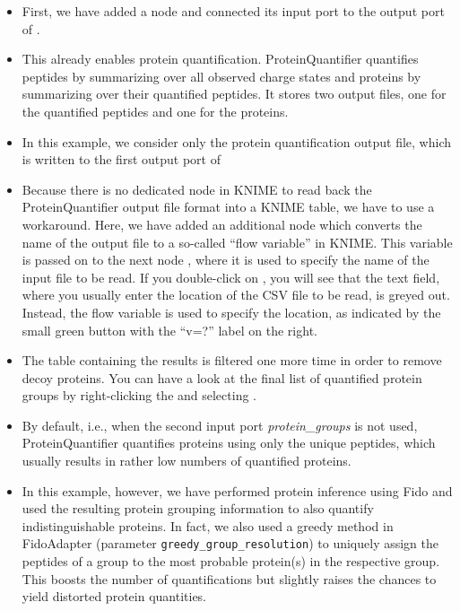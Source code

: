 \begin{itemize}
\item First, we have added a  node and connected its input port to the output port of .
\item This already enables protein quantification. ProteinQuantifier quantifies peptides by summarizing over all observed charge states and proteins
by summarizing over their quantified peptides. It stores two output files, one for the quantified peptides and one for the proteins.
\item In this example, we consider only the protein quantification output file, which is written to the first output port of 
\item Because there is no dedicated node in KNIME to read back the ProteinQuantifier output file format into a KNIME table, we have to use a workaround.
Here, we have added an additional
 node which converts the name of the output file to a so-called ``flow variable'' in KNIME. This variable is passed on
to the next node , where it is used to specify the name of the input file to be read. If you double-click on ,
you will see that the text field, where you usually enter the location of the CSV file to be read, is greyed out. Instead, the flow variable is used
to specify the location, as indicated by the small green button with the ``v=?'' label on the right.
\item The table containing the  results is filtered one more time in order to remove decoy proteins. You can have a look
at the final list of quantified protein groups by right-clicking the  and selecting .
\item By default, i.e., when the second input port \textit{protein\_groups} is not used, ProteinQuantifier quantifies 
proteins using only the unique peptides,
which usually results in rather low numbers of quantified proteins.
\item In this example, however, we have performed protein inference using Fido and used the resulting protein 
grouping information to also quantify
indistinguishable proteins. In fact, we also used a greedy method in FidoAdapter (parameter 
\texttt{greedy\_group\_resolution}) to uniquely assign the peptides of a group to the most probable protein(s) in the 
respective group. This boosts the number of quantifications but slightly raises the chances to yield distorted protein quantities.

\end{itemize}
